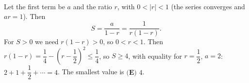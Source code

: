 Let the first term be $a$ and the ratio $r$, with $0<|r|<1$ (the series converges and $ar=1$). Then
\[S=\dfrac{a}{1-r}=\dfrac{1}{r(1-r)}.\]
For $S>0$ we need $r(1-r)>0$, so $0<r<1$. Then $r(1-r)=\dfrac14-\left(r-\dfrac12\right)^2\le\dfrac14$, so $S\ge4$, with equality for $r=\dfrac12$, $a=2$: $2+1+\dfrac12+\cdots=4$. The smallest value is $\boxed{\textbf{(E) } 4}$.
